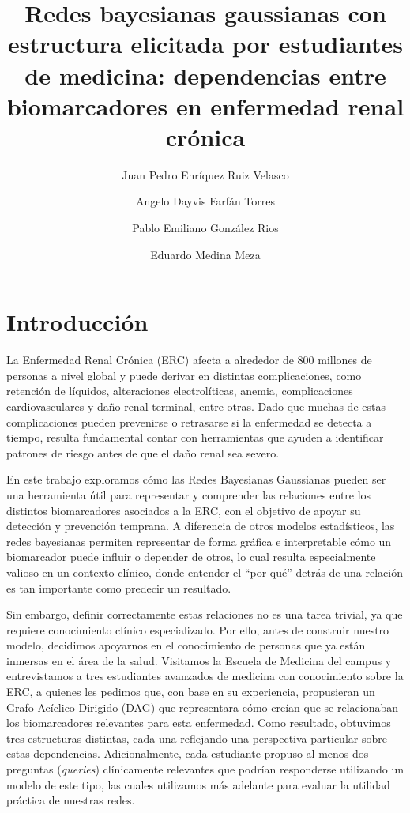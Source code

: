\documentclass[eng]{ajceam-class}
\title{Redes bayesianas gaussianas con estructura elicitada por estudiantes de medicina: dependencias entre biomarcadores en enfermedad renal crónica}
\author[1]{Juan Pedro Enríquez Ruiz Velasco}
\author[2]{Angelo Dayvis Farfán Torres}
\author[3]{Pablo Emiliano González Rios}
\author[5]{Eduardo Medina Meza}
\affil[1]{Instituto Tecnológico de Estudios Superiores de Monterrey (ITESM), Departamento de Ingeniería y Ciencias, Jalisco, México}
\begin{document}
\maketitle
\thispagestyle{fancy}
\newpage

\section{Introducción}
La Enfermedad Renal Crónica (ERC) afecta a alrededor de 800 millones de personas a nivel global y puede derivar en distintas complicaciones, como retención de líquidos, alteraciones electrolíticas, anemia, complicaciones cardiovasculares y daño renal terminal, entre otras. Dado que muchas de estas complicaciones pueden prevenirse o retrasarse si la enfermedad se detecta a tiempo, resulta fundamental contar con herramientas que ayuden a identificar patrones de riesgo antes de que el daño renal sea severo.

En este trabajo exploramos cómo las Redes Bayesianas Gaussianas pueden ser una herramienta útil para representar y comprender las relaciones entre los distintos biomarcadores asociados a la ERC, con el objetivo de apoyar su detección y prevención temprana. A diferencia de otros modelos estadísticos, las redes bayesianas permiten representar de forma gráfica e interpretable cómo un biomarcador puede influir o depender de otros, lo cual resulta especialmente valioso en un contexto clínico, donde entender el ``por qué'' detrás de una relación es tan importante como predecir un resultado.

Sin embargo, definir correctamente estas relaciones no es una tarea trivial, ya que requiere conocimiento clínico especializado. Por ello, antes de construir nuestro modelo, decidimos apoyarnos en el conocimiento de personas que ya están inmersas en el área de la salud. Visitamos la Escuela de Medicina del campus y entrevistamos a tres estudiantes avanzados de medicina con conocimiento sobre la ERC, a quienes les pedimos que, con base en su experiencia, propusieran un Grafo Acíclico Dirigido (DAG) que representara cómo creían que se relacionaban los biomarcadores relevantes para esta enfermedad. Como resultado, obtuvimos tres estructuras distintas, cada una reflejando una perspectiva particular sobre estas dependencias. Adicionalmente, cada estudiante propuso al menos dos preguntas (\textit{queries}) clínicamente relevantes que podrían responderse utilizando un modelo de este tipo, las cuales utilizamos más adelante para evaluar la utilidad práctica de nuestras redes.
\end{document}
